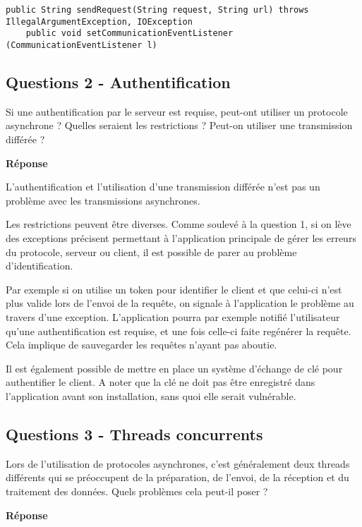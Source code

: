 \documentclass[francais,12pt]{article}
\begin{document}
	\begin{lstlisting}[style=javaCode]
	public String sendRequest(String request, String url) throws IllegalArgumentException, IOException 
	public void setCommunicationEventListener (CommunicationEventListener l) 
	\end{lstlisting}
	
	\subsection*{Questions 2 - Authentification}
	Si une authentification par le serveur est requise, peut-ont utiliser un protocole asynchrone ? Quelles seraient les restrictions ? Peut-on utiliser une transmission différée ?
	
	
	{\color[rgb]{0,0.5,0.23}\textbf{Réponse}}
	
	L'authentification et l'utilisation d'une transmission différée n'est pas un problème avec les transmissions asynchrones. 
	
	Les restrictions peuvent être diverses. Comme soulevé à la question 1, si on lève des exceptions précisent permettant à l'application principale de gérer les erreurs du protocole, serveur ou client, il est possible de parer au problème d'identification. 
	
	Par exemple si on utilise un token pour identifier le client et que celui-ci n'est plus valide lors de l'envoi de la requête, on signale à l'application le problème au travers d'une exception. L'application pourra par exemple notifié l'utilisateur qu'une authentification est requise, et une fois celle-ci faite regénérer la requête. Cela implique de sauvegarder les requêtes n'ayant pas aboutie. 
	
	Il est également possible de mettre en place un système d'échange de clé pour authentifier le client. A noter que la clé ne doit pas être enregistré dans l'application avant son installation, sans quoi elle serait vulnérable.
	
	\subsection*{Questions 3 - Threads concurrents}
	Lors de l'utilisation de protocoles asynchrones, c'est généralement deux threads différents qui se préoccupent de la préparation, de l'envoi, de la réception et du traitement des données. Quels problèmes cela peut-il poser ?
	
	{\color[rgb]{0,0.5,0.23}\textbf{Réponse}}
	
\end{document}
